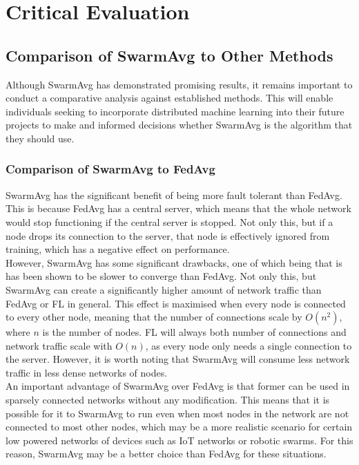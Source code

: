 \chapter{Critical Evaluation}
\section{Comparison of SwarmAvg to Other Methods}
Although SwarmAvg has demonstrated promising results, it remains important to conduct a comparative analysis against established methods. This will enable individuals seeking to incorporate distributed machine learning into their future projects to make and informed decisions whether SwarmAvg is the algorithm that they should use.

\subsection{Comparison of SwarmAvg to FedAvg}
SwarmAvg has the significant benefit of being more fault tolerant than FedAvg. This is because FedAvg has a central server, which means that the whole network would stop functioning if the central server is stopped. Not only this, but if a node drops its connection to the server, that node is effectively ignored from training, which has a negative effect on performance. \\

However, SwarmAvg has some significant drawbacks, one of which being that is has been shown to be slower to converge than FedAvg. Not only this, but SwarmAvg can create a significantly higher amount of network traffic than FedAvg or FL in general. This effect is maximised when every node is connected to every other node, meaning that the number of connections scale by $O(n^2)$, where $n$ is the number of nodes. FL will always both number of connections and network traffic scale with $O(n)$, as every node only needs a single connection to the server. However, it is worth noting that SwarmAvg will consume less network traffic in less dense networks of nodes. \\

An important advantage of SwarmAvg over FedAvg is that former can be used in sparsely connected networks without any modification. This means that it is possible for it to SwarmAvg to run even when most nodes in the network are not connected to most other nodes, which may be a more realistic scenario for certain low powered networks of devices such as IoT networks or robotic swarms. For this reason, SwarmAvg may be a better choice than FedAvg for these situations.

